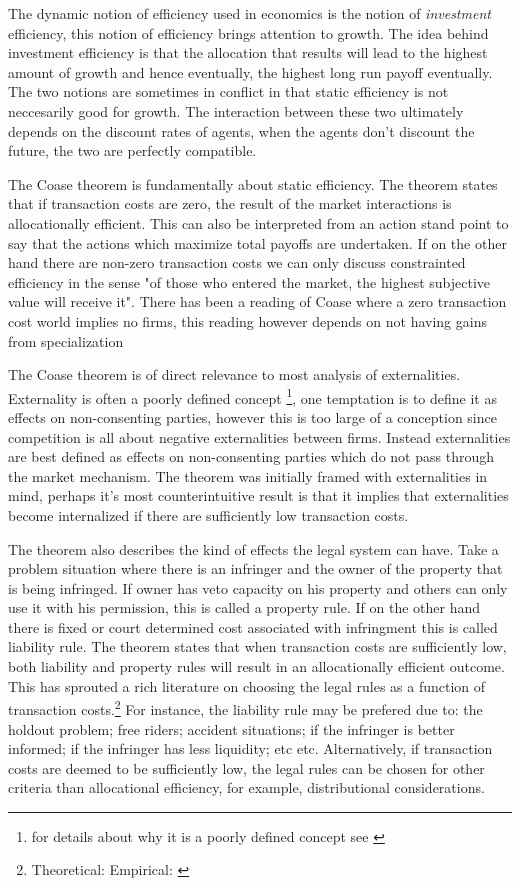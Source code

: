 \documentclass[12pt]{article}
\numberwithin{equation}{section}
\begin{document}
The dynamic notion of efficiency used in economics is the notion of \textit{investment} efficiency, this notion of efficiency brings attention to growth. The idea behind investment efficiency is that the allocation that results will lead to the highest amount of growth and hence eventually, the highest long run payoff eventually. The two notions are sometimes in conflict in that static efficiency is not neccesarily good for growth. The interaction between these two ultimately depends on the discount rates of agents, when the agents don't discount the future, the two are perfectly compatible. 

The Coase theorem is fundamentally about static efficiency. The theorem states that if transaction costs are zero, the result of the market interactions is allocationally efficient. This can also be interpreted from an action stand point to say that the actions which maximize total payoffs are undertaken. If on the other hand there are non-zero transaction costs we can only discuss constrainted efficiency in the sense "of those who entered the market, the highest subjective value will receive it". There has been a reading of Coase where a zero transaction cost world implies no firms, this reading however depends on not having gains from specialization \cite{demsetz2011rh}

The Coase theorem is of direct relevance to most analysis of externalities. Externality is often a poorly defined concept \footnote{for details about why it is a poorly defined concept see \cite{Cheung1970}}, one temptation is to define it as effects on non-consenting parties, however this is too large of a conception since competition is all about negative externalities between firms. Instead externalities are best defined as effects on non-consenting parties which do not pass through the market mechanism. The theorem was initially framed with externalities in mind, perhaps it's most counterintuitive result is that it implies that externalities become internalized if there are sufficiently low transaction costs. 

The theorem also describes the kind of effects the legal system can have. Take a problem situation where there is an infringer and the owner of the property that is being infringed. If owner has veto capacity on his property and others can only use it with his permission, this is called a property rule. If on the other hand there is fixed or court determined cost associated with infringment this is called liability rule. The theorem states that when transaction costs are sufficiently low, both liability and property rules will result in an allocationally efficient outcome. This has sprouted a rich literature on choosing the legal rules as a function of transaction costs.\footnote{Theoretical: \cite{calabresi1972property} Empirical: \cite{kaplow1995property}} For instance, the liability rule may be prefered due to: the holdout problem; free riders; accident situations; if the infringer is better informed; if the infringer has less liquidity; etc etc. Alternatively, if transaction costs are deemed to be sufficiently low, the legal rules can be chosen for other criteria than allocational efficiency, for example, distributional considerations. 
\end{document}
